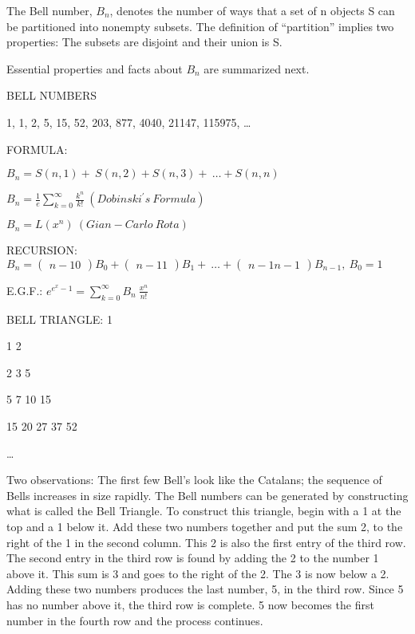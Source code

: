 \documentclass[10pt,letter]{article}
\begin{document}
The Bell number, \(B_{n}\), denotes the number of ways that a set of n
objects S can be partitioned into nonempty subsets. The definition of
``partition'' implies two properties: The subsets are disjoint and their
union is S.

Essential properties and facts about \(B_{n}\) are summarized next.

BELL NUMBERS

1, 1, 2, 5, 15, 52, 203, 877, 4040, 21147, 115975, \ldots{}

FORMULA:

\(B_{n} = S\left( n,1 \right) + \ S\left( n,2 \right) + S\left( n,3 \right) + \ \ldots + S(n,n)\)

\(B_{n} = \frac{1}{e}\sum_{k = 0}^{\infty}\frac{k^{n}}{k!}\ (Dobinski^{'}s\ Formula)\)

\(B_{n} = L\left( x^{n} \right)\ (Gian - Carlo\ Rota)\)

RECURSION: \(B_{n} =

\begin{pmatrix}
n - 1 
0 
\end{pmatrix}
B_{0} +

\begin{pmatrix}
n - 1 
1 
\end{pmatrix}
B_{1} + \ \ldots +

\begin{pmatrix}
n - 1 
n - 1 
\end{pmatrix}
B_{n - 1},\ B_{0} = 1\)

E.G.F.:
\(e^{e^{x} - 1} = \sum_{k = 0}^{\infty}{B_{n}\ \frac{x^{n}}{n!}}\)

BELL TRIANGLE: 1

1 2

2 3 5

5 7 10 15

15 20 27 37 52

\ldots{}

Two observations: The first few Bell's look like the Catalans; the
sequence of Bells increases in size rapidly. The Bell numbers can be
generated by constructing what is called the Bell Triangle. To construct
this triangle, begin with a 1 at the top and a 1 below it. Add these two
numbers together and put the sum 2, to the right of the 1 in the second
column. This 2 is also the first entry of the third row. The second
entry in the third row is found by adding the 2 to the number 1 above
it. This sum is 3 and goes to the right of the 2. The 3 is now below a
2. Adding these two numbers produces the last number, 5, in the third
row. Since 5 has no number above it, the third row is complete. 5 now
becomes the first number in the fourth row and the process continues.
\end{document}
